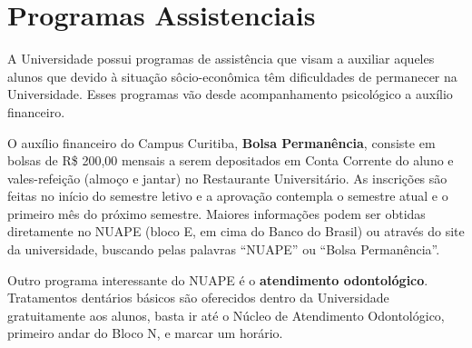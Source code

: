 \documentclass[a4paper,12pt,openany]{article}
\begin{document}
\newpage
\section{Programas Assistenciais}
 
A Universidade possui programas de assistência que visam a auxiliar aqueles alunos que devido à situação sôcio-econômica têm dificuldades de permanecer na Universidade. 
Esses programas vão desde acompanhamento psicológico a auxílio financeiro.

O auxílio financeiro do Campus Curitiba, \textbf{Bolsa Permanência}, consiste em bolsas de R\$ 200,00 mensais a serem depositados em Conta Corrente do aluno e vales-refeição (almoço e jantar) no Restaurante Universitário. As inscrições são feitas no início do semestre letivo e a aprovação contempla o semestre atual e o primeiro mês do próximo semestre. Maiores informações podem ser obtidas diretamente no NUAPE (bloco E, em cima do Banco do Brasil) ou através do site da universidade, buscando pelas palavras “NUAPE” ou “Bolsa Permanência”. 

Outro programa interessante do NUAPE é o \textbf{atendimento odontológico}. Tratamentos dentários básicos são oferecidos dentro da Universidade gratuitamente aos alunos, basta ir até o Núcleo de Atendimento Odontológico, primeiro andar do Bloco N, e marcar um horário. 



\end{document}
